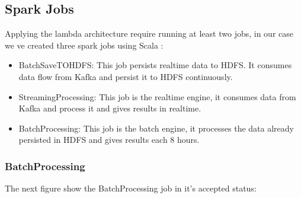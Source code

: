 \subsection{Spark Jobs}
\label{sec:sec01}
Applying the lambda architecture require running at least two jobs, in our case we ve created three spark jobs using Scala :
\begin{itemize}
\item BatchSaveTOHDFS: This job persists realtime data to HDFS. It consumes data flow from Kafka and persist it to HDFS continuously.
\item StreamingProcessing: This job is the realtime engine, it consumes data from Kafka and process it and gives results in realtime. 
\item BatchProcessing: This job is the batch engine, it processes the data already persisted in HDFS and gives results each 8 hours.
\end{itemize}
\subsubsection{BatchProcessing}
\label{sec:sec01}
The next figure show the BatchProcessing job in it's accepted status:

